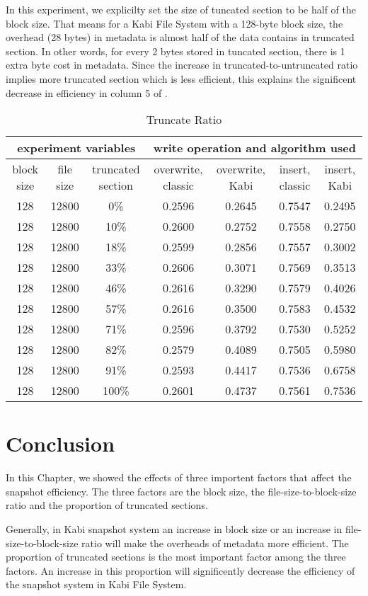     In this experiment, we explicilty set the size of tuncated section to be half of the block size. That means for a Kabi File System with a 128-byte block size, the overhead (28 bytes) in metadata is almost half of the data contains in truncated section. In other words, for every 2 bytes stored in tuncated section, there is 1 extra byte cost in metadata. Since the increase in truncated-to-untruncated ratio implies more truncated section which is less efficient, this explains the significent decrease in efficiency in column 5 of .

\begin{lscape} 
\begin{table}
\caption{Truncate Ratio}
\label{tab:truncate_ratio}
\begin{center}
\begin{tabular}{|c|c|c|c|c|c|c|}
\hline
\multicolumn{3}{|c|}{experiment variables} & \multicolumn{4}{c|}{write operation and algorithm used} \\
\hline
block size & file size & truncated section & overwrite, classic & overwrite, Kabi & insert, classic & insert, Kabi\\
\hline
128 & 12800 & 0\% & 0.2596 & 0.2645 & 0.7547 & 0.2495 \\
\hline
128 & 12800 & 10\% & 0.2600 & 0.2752 & 0.7558 & 0.2750 \\
\hline
128 & 12800 & 18\% & 0.2599 & 0.2856 & 0.7557 & 0.3002 \\
\hline
128 & 12800 & 33\% & 0.2606 & 0.3071 & 0.7569 & 0.3513 \\
\hline
128 & 12800 & 46\% & 0.2616 & 0.3290 & 0.7579 & 0.4026 \\
\hline
128 & 12800 & 57\% & 0.2616 & 0.3500 & 0.7583 & 0.4532 \\
\hline
128 & 12800 & 71\% & 0.2596 & 0.3792 & 0.7530 & 0.5252 \\
\hline
128 & 12800 & 82\% & 0.2579 & 0.4089 & 0.7505 & 0.5980 \\
\hline
128 & 12800 & 91\% & 0.2593 & 0.4417 & 0.7536 & 0.6758 \\
\hline
128 & 12800 & 100\% & 0.2601 & 0.4737 & 0.7561 & 0.7536 \\
\hline
\end{tabular}
\end{center}
\end{table}
\end{lscape}

\section{Conclusion}

    In this Chapter, we showed the effects of three importent factors that affect the snapshot efficiency. The three factors are the block size, the file-size-to-block-size ratio and the proportion of truncated sections.

    Generally, in Kabi snapshot system an increase in block size or an increase in file-size-to-block-size ratio will make the overheads of metadata more efficient. The proportion of truncated sections is the most important factor among the three factors. An increase in this proportion will significently decrease the efficiency of the snapshot system in Kabi File System.
